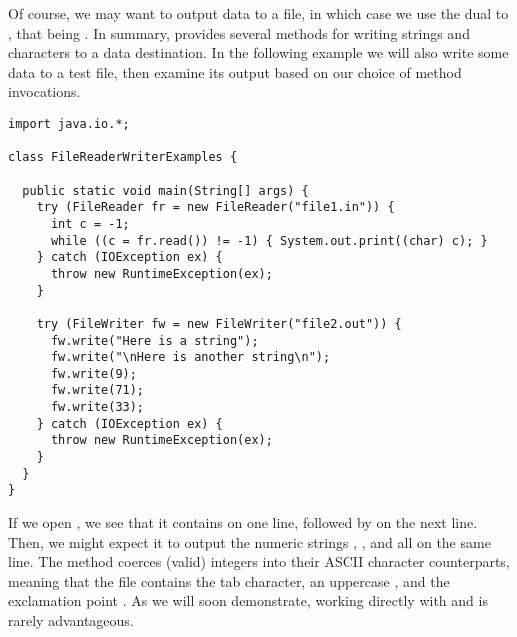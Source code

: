 Of course, we may want to output data to a file, in which case we use the dual to , that being . 
In summary,  provides several methods for writing strings and characters to a data destination. 
In the following example we will also write some data to a test file, then examine its output based on our choice of method invocations.

\begin{lstlisting}[language=MyJava]
import java.io.*;

class FileReaderWriterExamples {

  public static void main(String[] args) {
    try (FileReader fr = new FileReader("file1.in")) {
      int c = -1; 
      while ((c = fr.read()) != -1) { System.out.print((char) c); }
    } catch (IOException ex) {
      throw new RuntimeException(ex);
    }

    try (FileWriter fw = new FileWriter("file2.out")) {
      fw.write("Here is a string");
      fw.write("\nHere is another string\n"); 
      fw.write(9);
      fw.write(71);
      fw.write(33);
    } catch (IOException ex) {
      throw new RuntimeException(ex);
    }
  }
}

\end{lstlisting}

If we open , we see that it contains  on one line, followed by  on the next line. 
Then, we might expect it to output the numeric strings , , and  all on the same line. 
The  method coerces (valid) integers into their ASCII character counterparts, meaning that the file contains the tab character, an uppercase , and the exclamation point . 
As we will soon demonstrate, working directly with  and  is rarely advantageous. 

